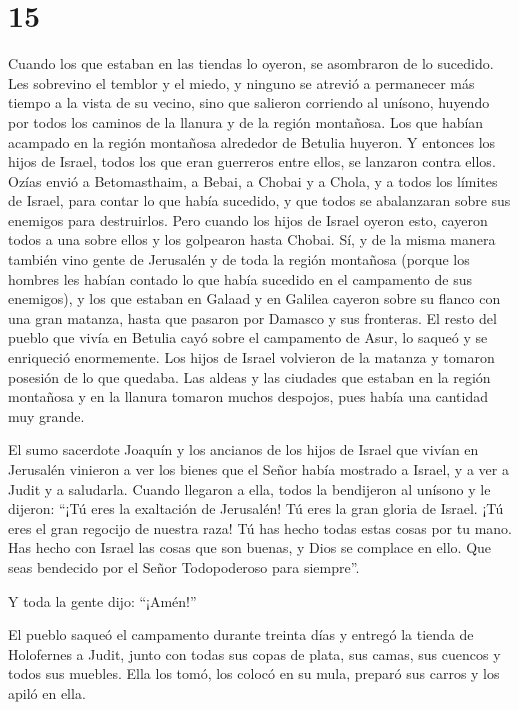 \hypertarget{section-14}{%
\section{15}\label{section-14}}

 Cuando los que estaban en las tiendas lo oyeron, se
asombraron de lo sucedido.  Les sobrevino el temblor y el
miedo, y ninguno se atrevió a permanecer más tiempo a la vista de su
vecino, sino que salieron corriendo al unísono, huyendo por todos los
caminos de la llanura y de la región montañosa.  Los que
habían acampado en la región montañosa alrededor de Betulia huyeron. Y
entonces los hijos de Israel, todos los que eran guerreros entre ellos,
se lanzaron contra ellos.  Ozías envió a Betomasthaim, a
Bebai, a Chobai y a Chola, y a todos los límites de Israel, para contar
lo que había sucedido, y que todos se abalanzaran sobre sus enemigos
para destruirlos.  Pero cuando los hijos de Israel oyeron
esto, cayeron todos a una sobre ellos y los golpearon hasta Chobai. Sí,
y de la misma manera también vino gente de Jerusalén y de toda la región
montañosa (porque los hombres les habían contado lo que había sucedido
en el campamento de sus enemigos), y los que estaban en Galaad y en
Galilea cayeron sobre su flanco con una gran matanza, hasta que pasaron
por Damasco y sus fronteras.  El resto del pueblo que
vivía en Betulia cayó sobre el campamento de Asur, lo saqueó y se
enriqueció enormemente.  Los hijos de Israel volvieron de
la matanza y tomaron posesión de lo que quedaba. Las aldeas y las
ciudades que estaban en la región montañosa y en la llanura tomaron
muchos despojos, pues había una cantidad muy grande.

 El sumo sacerdote Joaquín y los ancianos de los hijos de
Israel que vivían en Jerusalén vinieron a ver los bienes que el Señor
había mostrado a Israel, y a ver a Judit y a saludarla. 
Cuando llegaron a ella, todos la bendijeron al unísono y le dijeron:
``¡Tú eres la exaltación de Jerusalén! Tú eres la gran gloria de Israel.
¡Tú eres el gran regocijo de nuestra raza!  Tú has hecho
todas estas cosas por tu mano. Has hecho con Israel las cosas que son
buenas, y Dios se complace en ello. Que seas bendecido por el Señor
Todopoderoso para siempre''.

Y toda la gente dijo: ``¡Amén!''

 El pueblo saqueó el campamento durante treinta días y
entregó la tienda de Holofernes a Judit, junto con todas sus copas de
plata, sus camas, sus cuencos y todos sus muebles. Ella los tomó, los
colocó en su mula, preparó sus carros y los apiló en ella.

